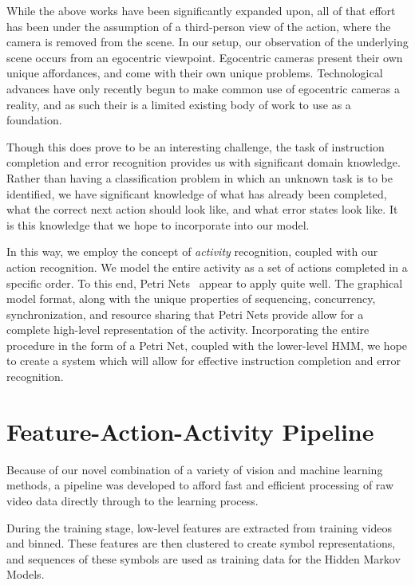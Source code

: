 \documentclass[10pt,twocolumn,letterpaper]{article}
\begin{document}
While the above works have been significantly expanded upon, all of that effort has been under the assumption of a third-person view of the action, where the camera is removed from the scene. In our setup, our observation of the underlying scene occurs from an egocentric viewpoint. Egocentric cameras present their own unique affordances, and come with their own unique problems. Technological advances have only recently begun to make common use of egocentric cameras a reality, and as such their is a limited existing body of work to use as a foundation.

Though this does prove to be an interesting challenge, the task of instruction completion and error recognition provides us with significant domain knowledge. Rather than having a classification problem in which an unknown task is to be identified, we have significant knowledge of what has already been completed, what the correct next action should look like, and what error states look like. It is this knowledge that we hope to incorporate into our model.

In this way, we employ the concept of \emph{activity} recognition, coupled with our action recognition. We model the entire activity as a set of actions completed in a specific order. To this end, Petri Nets~\cite{petri1966communication} appear to apply quite well. The graphical model format, along with the unique properties of sequencing, concurrency, synchronization, and resource sharing\cite{david1994petri} that Petri Nets provide allow for a complete high-level representation of the activity. Incorporating the entire procedure in the form of a Petri Net, coupled with the lower-level HMM, we hope to create a system which will allow for effective instruction completion and error recognition.


\section{Feature-Action-Activity Pipeline}
Because of our novel combination of a variety of vision and machine learning methods, a pipeline was developed to afford fast and efficient processing of raw video data directly through to the learning process.

During the training stage, low-level features are extracted from training videos and binned. These features are then clustered to create symbol representations, and sequences of these symbols are used as training data for the Hidden Markov Models.
\end{document}
